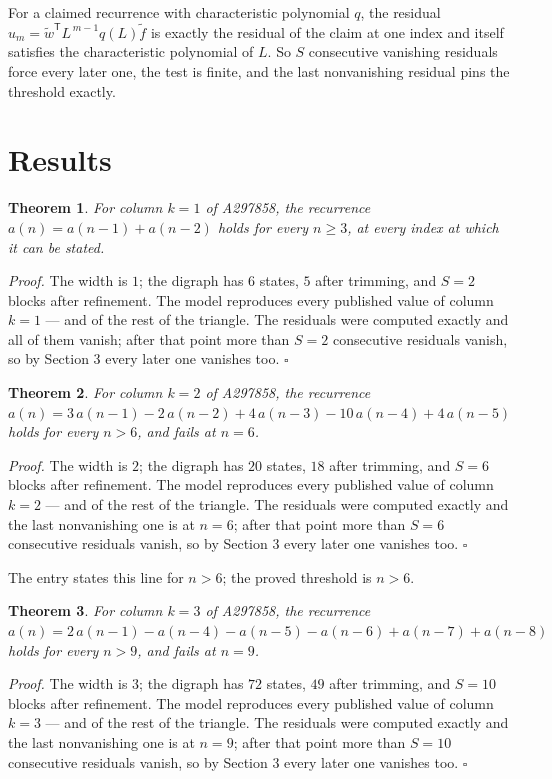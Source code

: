 \documentclass[11pt]{article}
\newtheorem{theorem}{Theorem}
\theoremstyle{definition}
\begin{document}
For a claimed recurrence with characteristic polynomial $q$, the residual $u_m = \tilde w^{\mathsf T}L^{\,m-1}q(L)\tilde f$ is exactly the residual of the claim at one index and itself satisfies the characteristic polynomial of $L$. So $S$ consecutive vanishing residuals force every later one, the test is finite, and the last nonvanishing residual pins the threshold exactly.

\section{Results}

\begin{theorem} For column $k = 1$ of A297858, the recurrence $a(n) = a(n-1) + a(n-2)$ holds for every $n \ge 3$, at every index at which it can be stated.\end{theorem}

{\itshape Proof.} The width is $1$; the digraph has $6$ states, $5$ after trimming, and $S = 2$ blocks after refinement. The model reproduces every published value of column $k = 1$ --- and of the rest of the triangle. The residuals were computed exactly and all of them vanish; after that point more than $S = 2$ consecutive residuals vanish, so by Section 3 every later one vanishes too. $\square$

\begin{theorem} For column $k = 2$ of A297858, the recurrence $a(n) = 3\,a(n-1) - 2\,a(n-2) + 4\,a(n-3) - 10\,a(n-4) + 4\,a(n-5)$ holds for every $n > 6$, and fails at $n = 6$.\end{theorem}

{\itshape Proof.} The width is $2$; the digraph has $20$ states, $18$ after trimming, and $S = 6$ blocks after refinement. The model reproduces every published value of column $k = 2$ --- and of the rest of the triangle. The residuals were computed exactly and the last nonvanishing one is at $n = 6$; after that point more than $S = 6$ consecutive residuals vanish, so by Section 3 every later one vanishes too. $\square$

The entry states this line for $n > 6$; the proved threshold is $n > 6$.

\begin{theorem} For column $k = 3$ of A297858, the recurrence $a(n) = 2\,a(n-1) - a(n-4) - a(n-5) - a(n-6) + a(n-7) + a(n-8)$ holds for every $n > 9$, and fails at $n = 9$.\end{theorem}

{\itshape Proof.} The width is $3$; the digraph has $72$ states, $49$ after trimming, and $S = 10$ blocks after refinement. The model reproduces every published value of column $k = 3$ --- and of the rest of the triangle. The residuals were computed exactly and the last nonvanishing one is at $n = 9$; after that point more than $S = 10$ consecutive residuals vanish, so by Section 3 every later one vanishes too. $\square$
\end{document}
